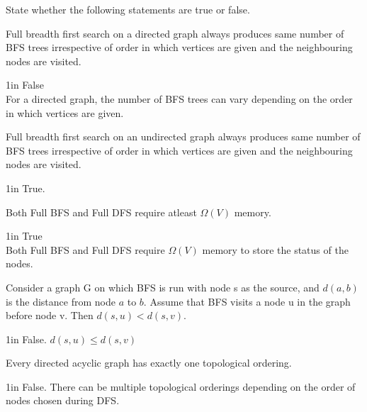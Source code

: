 \begin{prob}
    State whether the following statements are true or false.

    \begin{subprobset}
        \begin{subprob}
            Full breadth first search on a directed graph always produces same number of BFS trees irrespective of order in which vertices are given and the neighbouring nodes are visited.
	        \begin{responsebox}{1in}
    		    False\\
                For a directed graph, the number of BFS trees can vary depending on the order in which vertices are given.
    		\end{responsebox}
        \end{subprob}

        \begin{subprob}
            Full breadth first search on an undirected graph always produces same number of BFS trees irrespective of order in which vertices are given and the neighbouring nodes are visited.
	        \begin{responsebox}{1in}
    		    True.
    		\end{responsebox}
        \end{subprob}

        \begin{subprob}
            Both Full BFS and Full DFS require atleast $\Omega(V)$ memory.
	        \begin{responsebox}{1in}
    		    True \\
                Both Full BFS and Full DFS require $\Omega(V)$ memory to store the status of the nodes.
    		\end{responsebox}
        \end{subprob}

        \begin{subprob}
            Consider a graph G on which BFS is run with node s as the source, and $d(a, b)$ is the distance from node $a$ to $b$. Assume that BFS visits a node u in the graph before node v. Then $d(s,u) < d(s,v)$.
	        \begin{responsebox}{1in}
    		    False. $d(s,u) \leq d(s,v)$
    		\end{responsebox}
        \end{subprob}

        \begin{subprob}
            Every directed acyclic graph has exactly one topological ordering.
	        \begin{responsebox}{1in}
    		    False. There can be multiple topological orderings depending on the order of nodes chosen during DFS.
    		\end{responsebox}
        \end{subprob}
    \end{subprobset}
\end{prob}
